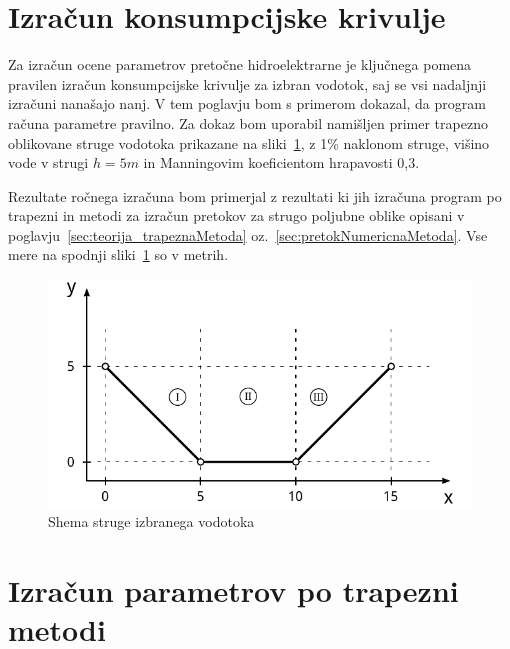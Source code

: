 \newpage

\section{Izračun konsumpcijske krivulje}\label{sec:izracun}

Za izračun ocene parametrov pretočne hidroelektrarne je ključnega pomena pravilen izračun konsumpcijske krivulje za izbran vodotok, saj se vsi nadaljnji izračuni nanašajo nanj. V tem poglavju bom s primerom dokazal, da program računa parametre pravilno. Za dokaz bom uporabil namišljen primer trapezno oblikovane struge vodotoka prikazane na sliki~\ref{fig:izracun_trapeznaStruga}, z 1\% naklonom struge, višino vode v strugi $h=5m$ in Manningovim koeficientom hrapavosti 0,3.

Rezultate ročnega izračuna bom primerjal z rezultati ki jih izračuna program po trapezni in metodi za izračun pretokov za strugo poljubne oblike opisani v poglavju~\ref{sec:teorija_trapeznaMetoda}  oz.~\ref{sec:pretokNumericnaMetoda}. Vse mere na spodnji  sliki~\ref{fig:izracun_trapeznaStruga} so v metrih.



\begin{figure}[ht!]
	\begin{centering}
		\includegraphics{slike/izracuni/shema_trapezneStruge.pdf}		
		\caption{Shema struge izbranega vodotoka}\label{fig:izracun_trapeznaStruga}
	\end{centering}
\end{figure}




\section{Izračun parametrov po trapezni metodi}\label{sec:izracun_trapeznaMetoda}



